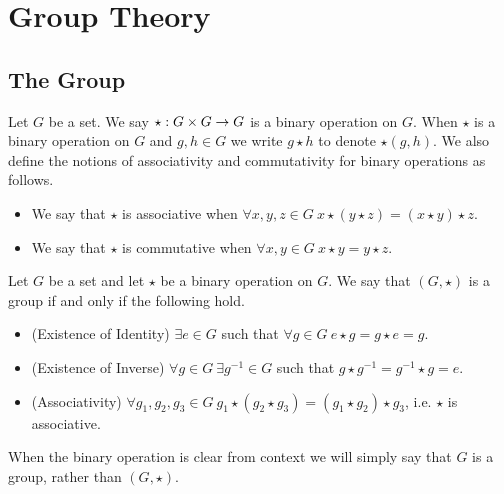 

\chapter{Group Theory}
    \section{The Group}
        \begin{definition}
            Let $G$ be a set. We say $\star : G \times G \rightarrow G$ is a binary
            operation on $G$. When $\star$ is a binary operation on $G$ and $g, h \in G$
            we write $g \star h$ to denote $\star(g, h)$. We also define the notions of
            associativity and commutativity for binary operations as follows.
            \begin{itemize}
                \item
                    We say that $\star$ is associative when
                    $\forall x, y, z \in G \ x \star (y \star z) = (x \star y) \star z$.
                \item
                    We say that $\star$ is commutative when
                    $\forall x, y \in G \ x \star y = y \star z$.
            \end{itemize}
        \end{definition}
        \begin{definition}
            Let $G$ be a set and let $\star$ be a binary operation on $G$. We say that
            $(G, \star)$ is a group if and only if the following hold.
            \begin{itemize}
                \item
                    (Existence of Identity) $\exists e \in G$ such that $\forall g \in G \ 
                    e \star g = g \star e = g$.
                \item
                    (Existence of Inverse) $\forall g \in G \ \exists g^{-1} \in G$ such that
                    $g \star g^{-1} = g^{-1} \star g = e$.
                \item
                    (Associativity) $\forall g_1, g_2, g_3 \in G \ 
                    g_1 \star (g_2 \star g_3) = (g_1 \star g_2) \star g_3$, i.e.
                    $\star$ is associative.
            \end{itemize}
            When the binary operation is clear from context we will simply say that
            $G$ is a group, rather than $(G, \star)$.
        \end{definition}
